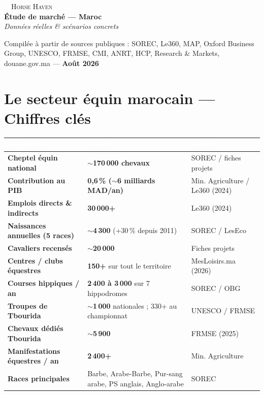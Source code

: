 \documentclass[11pt,a4paper]{article}
\newcommand{\thead}[1]{\textcolor{white}{\textbf{#1}}}
\begin{document}
\noindent
\begin{tcolorbox}[colback=navy, colframe=navy, boxrule=0pt, arc=3mm, left=4mm, right=4mm, top=3mm, bottom=3mm]
\centering
{\color{white}\LARGE\faHorse\ \ \textsc{Horse Haven}}\\[2mm]
{\color{gold}\Large\bfseries Étude de marché --- Maroc}\\[1mm]
{\color{white!70!royalblue}\itshape Données réelles \& scénarios concrets}
\end{tcolorbox}

\vspace{2mm}
\noindent
\begin{tcolorbox}[colback=lightblue, colframe=royalblue, boxrule=0.6pt, arc=2mm, left=3mm, right=3mm, top=1.5mm, bottom=1.5mm]
{\small\color{graytext} Compilée à partir de sources publiques : SOREC, Le360, MAP, Oxford Business Group, UNESCO, FRMSE, CMI, ANRT, HCP, Research \& Markets, douane.gov.ma --- \textbf{Août 2026}}
\end{tcolorbox}

\section{Le secteur équin marocain --- Chiffres clés}

{\small
\noindent
\begin{tabular}{L{4.6cm} L{7.4cm} L{3.5cm}}
\toprule
{}
\thead{Indicateur} & \thead{Valeur} & \thead{Source}\\
\midrule
\textbf{Cheptel équin national} & \textbf{$\sim$170\,000 chevaux} & SOREC / fiches projets\\
\textbf{Contribution au PIB} & \textbf{0,6\,\% ($\sim$6 milliards MAD/an)} & Min. Agriculture / Le360 (2024)\\
\textbf{Emplois directs \& indirects} & \textbf{30\,000+} & Le360 (2024)\\
\textbf{Naissances annuelles (5 races)} & \textbf{$\sim$4\,300} (+30\,\% depuis 2011) & SOREC / LesEco\\
\textbf{Cavaliers recensés} & \textbf{$\sim$20\,000} & Fiches projets\\
\textbf{Centres / clubs équestres} & \textbf{150+} sur tout le territoire & MesLoisirs.ma (2026)\\
\textbf{Courses hippiques / an} & \textbf{2\,400 à 3\,000} sur 7 hippodromes & SOREC / OBG\\
\textbf{Troupes de Tbourida} & \textbf{$\sim$1\,000} nationales ; 330+ au championnat & UNESCO / FRMSE\\
\textbf{Chevaux dédiés Tbourida} & \textbf{$\sim$5\,900} & FRMSE (2025)\\
\textbf{Manifestations équestres / an} & \textbf{2\,400+} & Min. Agriculture\\
\textbf{Races principales} & Barbe, Arabe-Barbe, Pur-sang arabe, PS anglais, Anglo-arabe & SOREC\\
\bottomrule
\end{tabular}}
\end{document}
